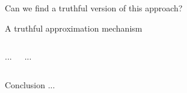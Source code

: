 \documentclass[aspectratio=169]{beamer}
\begin{document}
\begin{frame}[standout]
    Can we find a \alert{truthful version} of this approach?
\end{frame}

\begin{frame}{A truthful approximation mechanism}
    \begin{columns}
        ...

        ...
    \end{columns}
\end{frame}

\begin{frame}{Conclusion}
    ...
\end{frame}
\end{document}
